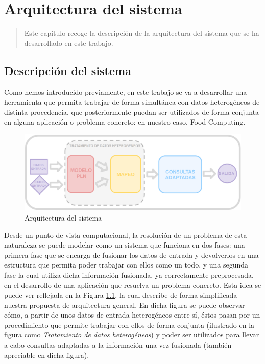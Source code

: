 \chapter{Arquitectura del sistema}
\label{ch:Capitulo 4}

\begin{quote}
  Este capítulo recoge la descripción de la arquitectura del sistema que se ha desarrollado en este trabajo.
\end{quote}

\section{Descripción del sistema}

Como hemos introducido previamente, en este trabajo se va a desarrollar una herramienta que permita trabajar de forma simultánea con datos heterogéneos de distinta procedencia, que posteriormente puedan ser utilizados de forma conjunta en alguna aplicación o problema concreto: en nuestro caso, Food Computing.

\begin{figure}[H]
    \centering
    \includegraphics[width=1.0\textwidth]{imagenes/arquitectura/arquitectura-global.png}
    \caption{Arquitectura del sistema}
    \label{fig:arq_1}
\end{figure}

Desde un punto de vista computacional, la resolución de un problema de esta naturaleza se puede modelar como un sistema que funciona en dos fases: una primera fase que se encarga de fusionar los datos de entrada y devolverlos en una estructura que permita poder trabajar con ellos como un todo, y una segunda fase la cual utiliza dicha información fusionada, ya correctamente preprocesada, en el desarrollo de una aplicación que resuelva un problema concreto. Esta idea se puede ver reflejada en la Figura \ref{fig:arq_1}, la cual describe de forma simplificada nuestra propuesta de arquitectura general. En dicha figura se puede observar cómo, a partir de unos datos de entrada heterogéneos entre sí, éstos pasan por un procedimiento que permite trabajar con ellos de forma conjunta (ilustrado en la figura como \textit{Tratamiento de datos heterogéneos}) y poder ser utilizados para llevar a cabo consultas adaptadas a la información una vez fusionada (también apreciable en dicha figura).

